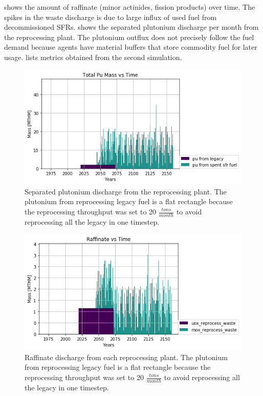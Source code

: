  shows the amount of raffinate
(minor actinides, fission products) over time. The spikes in the 
waste discharge is due to large influx of used fuel from
decommissioned \glspl{SFR}.  shows the separated plutonium discharge
per month from the reprocessing plant. The plutonium outflux
does not precisely follow the fuel demand because \Cyclus agents have
material buffers that store commodity fuel for later usage. 
 lists metrics obtained from the second simulation.

\begin{figure}[htbp!]
	\begin{center}
		\includegraphics[scale=0.7]{./images/french-transition/pu.png}
	\end{center}
	\caption{Separated plutonium discharge from the reprocessing plant.
			 The plutonium from reprocessing legacy fuel is a flat rectangle because the 
			 reprocessing throughput was set to 20 $\frac{tons}{month}$ to avoid reprocessing
			 all the legacy in one timestep.}
	\label{fig:pu_no_cum}
\end{figure}


\begin{figure}[htbp!]
	\begin{center}
		\includegraphics[scale=0.7]{./images/french-transition/reprocess_waste.png}
	\end{center}
	\caption{Raffinate discharge from each reprocessing plant.
			The plutonium from reprocessing legacy fuel is a flat rectangle because the 
			reprocessing throughput was set to 20 $\frac{tons}{month}$ to avoid reprocessing
			all the legacy in one timestep.}
	\label{fig:reprocess_waste}
\end{figure}



